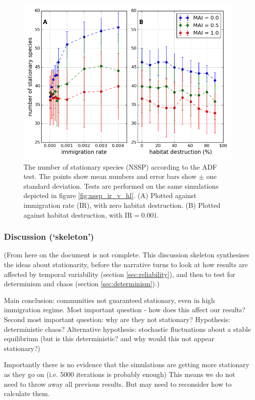 \begin{figure}[h!]
	\centering
	\includegraphics[width=0.8\linewidth]{"./chapters/chapter04b/figures/nssp_v_ir_and_hl"}
    \caption{The number of stationary species (NSSP) according to the ADF test. The points show mean numbers and error bars show $\pm$ one standard deviation. Tests are performed on the same simulations depicted in figure \ref{fig:nssp_ir_v_hl}. (A) Plotted against immigration rate (IR), with zero habitat destruction. (B) Plotted against habitat destruction, with IR$=0.001$. }    
    \label{fig:nssp_v_ir_and_hl}
\end{figure}

\subsubsection{Discussion (`skeleton')}
\label{sec:stationarity_discussion}

(From here on the document is not complete. This discussion skeleton synthesises the ideas about stationarity, before the narrative turns to look at how results are affected by temporal variability (section \ref{sec:reliability}), and then to test for determinism and chaos (section \ref{sec:determinism}).)

Main conclusion: communities not guaranteed stationary, even in high immigration regime. Most important question - how does this affect our results?  Second most important question: why are they not stationary? Hypothesis: deterministic chaos? Alternative hypothesis: stochastic fluctuations about a stable equilibrium (but is this deterministic? and why would this not appear stationary?)

Importantly there is no evidence that the simulations are getting more stationary as they go on (i.e. 5000 iterations is probably enough) This means we do not need to throw away all previous results. But may need to reconsider how to calculate them.

